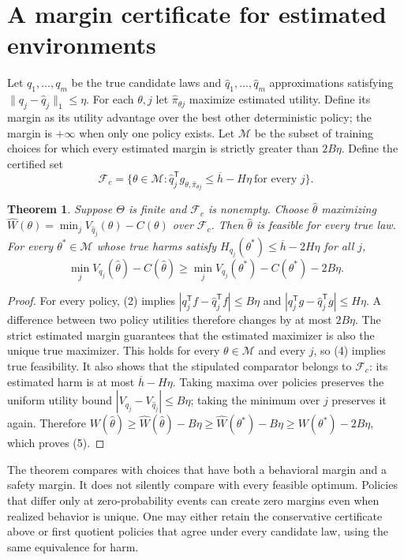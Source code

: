 \documentclass[11pt]{article}
\newtheorem{theorem}{Theorem}
\theoremstyle{definition}
\begin{document}
\section*{A margin certificate for estimated environments}
Let $q_1,\ldots,q_m$ be the true candidate laws and
$\widehat q_1,\ldots,\widehat q_m$ approximations satisfying
$\|q_j-\widehat q_j\|_1\le\eta$. For each $\theta,j$ let
$\widehat\pi_{\theta j}$ maximize estimated utility. Define its margin
as its utility advantage over the best other deterministic policy;
the margin is $+\infty$ when only one policy exists. Let
$\mathcal M$ be the subset of training choices for which every estimated
margin is strictly greater than $2B\eta$. Define the certified set
\[
 \mathcal F_c=\{\theta\in\mathcal M:
 \widehat q_j^{\mathsf T}g_{\theta,\widehat\pi_{\theta j}}
 \le\overline h-H\eta\ \text{for every }j\}.              \tag{4}
\]

\begin{theorem}
Suppose $\Theta$ is finite and $\mathcal F_c$ is nonempty. Choose
$\widehat\theta$ maximizing
$\widehat W(\theta)=\min_j V_{\widehat q_j}(\theta)-C(\theta)$
over $\mathcal F_c$. Then $\widehat\theta$ is feasible for every true
law. For every $\theta^*\in\mathcal M$ whose true harms satisfy
$H_{q_j}(\theta^*)\le\overline h-2H\eta$ for all $j$,
\[
 \min_j V_{q_j}(\widehat\theta)-C(\widehat\theta)
 \ge \min_j V_{q_j}(\theta^*)-C(\theta^*)-2B\eta.          \tag{5}
\]
\end{theorem}
\begin{proof}
For every policy, (2) implies
$|q_j^{\mathsf T}f-\widehat q_j^{\mathsf T}f|\le B\eta$ and
$|q_j^{\mathsf T}g-\widehat q_j^{\mathsf T}g|\le H\eta$.
A difference between two policy utilities therefore changes by at most
$2B\eta$. The strict estimated margin guarantees that the estimated
maximizer is also the unique true maximizer. This holds for every
$\theta\in\mathcal M$ and every $j$, so (4) implies true feasibility.
It also shows that the stipulated comparator belongs to $\mathcal F_c$:
its estimated harm is at most $\overline h-H\eta$.
Taking maxima over policies preserves the uniform utility bound
$|V_{q_j}-V_{\widehat q_j}|\le B\eta$; taking the minimum over $j$
preserves it again. Therefore
$W(\widehat\theta)\ge\widehat W(\widehat\theta)-B\eta
\ge\widehat W(\theta^*)-B\eta\ge W(\theta^*)-2B\eta$,
which proves (5).
\end{proof}
The theorem compares with choices that have both a behavioral margin and
a safety margin. It does not silently compare with every feasible optimum.
Policies that differ only at zero-probability events can create zero
margins even when realized behavior is unique. One may either retain
the conservative certificate above or first quotient policies that agree
under every candidate law, using the same equivalence for harm.
\end{document}
